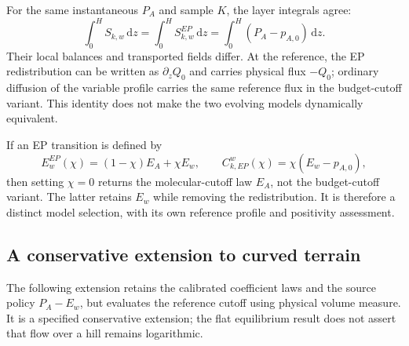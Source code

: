 \documentclass[11pt,a4paper]{article}
\numberwithin{equation}{section}
\begin{document}
For the same instantaneous $P_A$ and sample $K$, the layer integrals agree:
\begin{equation}
 \int_0^HS_{k,w}\,\mathrm dz
 =\int_0^HS_{k,w}^{EP}\,\mathrm dz
 =\int_0^H(P_A-p_{A,0})\,\mathrm dz.
 \label{ba:equal-integrated-sources}
\end{equation}
Their local balances and transported fields differ. At the reference,
the EP redistribution can be written as $\partial_zQ_0$ and carries
physical flux $-Q_0$; ordinary diffusion of the variable profile carries
the same reference flux in the budget-cutoff variant. This identity
does not make the two evolving models dynamically equivalent.

If an EP transition is defined by
\begin{equation}
 E_w^{EP}(\chi)=(1-\chi)E_A+\chi E_w,\qquad
 C_{k,EP}^w(\chi)=\chi(E_w-p_{A,0}),
 \label{ba:ep-transition}
\end{equation}
then setting $\chi=0$ returns the molecular-cutoff law $E_A$, not the
budget-cutoff variant. The latter retains $E_w$ while removing the
redistribution. It is therefore a distinct model selection, with its
own reference profile and positivity assessment.

\subsection{A conservative extension to curved terrain}
\label{ba:curved}

The following extension retains the calibrated coefficient laws and the
source policy $P_A-E_w$, but evaluates the reference cutoff using physical
volume measure. It is a specified conservative extension; the flat
equilibrium result does not assert that flow over a hill remains logarithmic.
\end{document}
